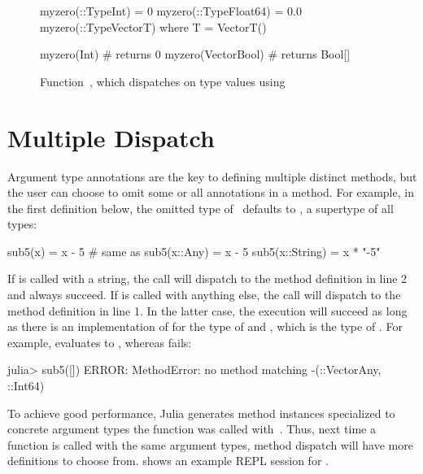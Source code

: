 \begin{figure}[t]
\centering
\begin{minipage}{8cm}
\begin{julia}
myzero(::Type{Int})               = 0
myzero(::Type{Float64})           = 0.0
myzero(::Type{Vector{T}}) where T = Vector{T}()

myzero(Int)           # returns 0
myzero(Vector{Bool})  # returns Bool[]
\end{julia}
\end{minipage}
\caption{Function~, which dispatches on type values
using }\label{fig:code:dispatch-on-type}
\end{figure}

\section{Multiple Dispatch}\label{sec:background:dispatch}

Argument type annotations are the key to defining multiple distinct
methods, but the user can choose to omit some or all annotations in a method.
For example, in the first  definition below, the omitted type
of~ defaults to , a supertype of all types:
\begin{codeenvd}
\begin{julia}
sub5(x) = x - 5             # same as sub5(x::Any) = x - 5
sub5(x::String) = x * "-5"
\end{julia}
\end{codeenvd}
If  is called with a string, the call will dispatch to the method 
definition in line 2 and always succeed. 
If  is called with anything else,
the call will dispatch to the method definition in line 1. 
In the latter case, the execution will succeed
as long as there is an implementation of \cjl{(-)} for the type of 
and , which is the type of .
For example,  evaluates to ,
whereas  fails:
\begin{codeenvd}
\begin{julia}
julia> sub5([])
ERROR: MethodError: no method matching -(::Vector{Any}, ::Int64)
\end{julia}
\end{codeenvd}
To achieve good performance, Julia generates method instances
specialized to concrete argument types the function was called
with~\cite{bib:pelenitsyn:type-stability:oopsla:2021}.
Thus, next time a function is called with the same argument types,
method dispatch will have more definitions to choose from.
 shows an example REPL session for .

